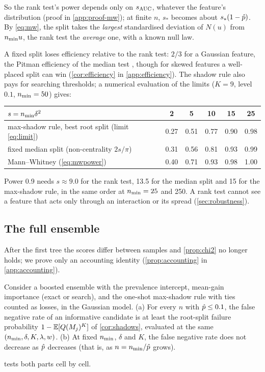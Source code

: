 So the rank test's power depends only on $s_{\mathrm{AUC}}$, whatever the feature's distribution (proof in \cref{app:proof-mw}); at finite $n$, $s_*$ becomes about $s_*(1-\hat p)$. By \eqref{eq:mw}, the split takes the \emph{largest} standardised deviation of $N(u)$ from $n_{\min} u$, the rank test the \emph{average} one, with a known null law.

A fixed split loses efficiency relative to the rank test: $2/3$ for a Gaussian feature, the Pitman efficiency of the median test \citep{mood1954asymptotic}, though for skewed features a well-placed split can win (\cref{cor:efficiency} in \cref{app:efficiency}). The shadow rule also pays for searching thresholds; a numerical evaluation of the limits ($K = 9$, level $0.1$, $n_{\min} = 50$) gives:

\begin{center}\small
\begin{tabular}{lccccc}
\toprule
$s = n_{\min}\delta^2$ & 2 & 5 & 10 & 15 & 25\\
\midrule
max-shadow rule, best root split (limit \eqref{eq:limit}) & 0.27 & 0.51 & 0.77 & 0.90 & 0.98\\
fixed median split (non-centrality $2s/\pi$) & 0.31 & 0.56 & 0.81 & 0.93 & 0.99\\
Mann--Whitney (\cref{eq:mwpower}) & 0.40 & 0.71 & 0.93 & 0.98 & 1.00\\
\bottomrule
\end{tabular}
\end{center}

Power 0.9 needs $s \approx 9.0$ for the rank test, 13.5 for the median split and 15 for the max-shadow rule, in the same order at $n_{\min} = 25$ and 250. A rank test cannot see a feature that acts only through an interaction or its spread (\cref{sec:robustness}).

\subsection{The full ensemble}\label{sec:ensemble}

After the first tree the scores differ between samples and \cref{prop:chi2} no longer holds; we prove only an accounting identity (\cref{prop:accounting} in \cref{app:accounting}).

\begin{conjecture}\label{conj:ensemble}
Consider a boosted ensemble with the prevalence intercept, mean-gain importance (exact or  search), and the one-shot max-shadow rule with ties counted as losses, in the Gaussian model. (a) For every $n$ with $\hat p \le 0.1$, the false negative rate of an informative candidate is at least the root-split failure probability $1 - \mathbb{E}[Q(M_j)^K]$ of \cref{cor:shadows}, evaluated at the same $(n_{\min}, \delta, K, \lambda, w)$. (b) At fixed $n_{\min}$, $\delta$ and $K$, the false negative rate does not decrease as $\hat p$ decreases (that is, as $n = n_{\min}/\hat p$ grows).
\end{conjecture}

 tests both parts cell by cell.
